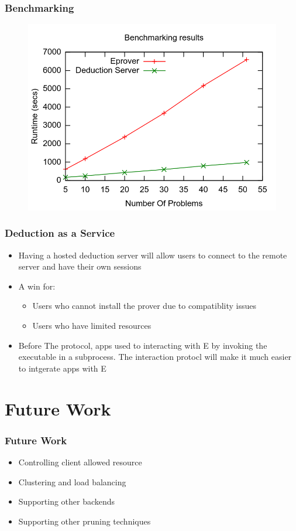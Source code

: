 \documentclass[10pt]{beamer}
\begin{document}
\begin{frame}[fragile]
  \frametitle{Benchmarking}
\begin{figure} \includegraphics[width=\linewidth,height=0.9\textheight,keepaspectratio]{imgs/BenchmarkingResults.png} \end{figure}
\end{frame}

\begin{frame}[fragile]
  \frametitle{Deduction as a Service}
  \begin{itemize}[<+- | alert@+>]
    \item Having a hosted deduction server will allow users to connect to the remote server and have their own sessions
    \item A win for:
      \begin{itemize}
          \item Users who cannot install the prover due to compatiblity issues
          \item Users who have limited resources
      \end{itemize}
    \item Before The protocol, apps used to interacting with E by invoking the executable in a subprocess. The interaction protocl will make it much easier to intgerate apps with E
  \end{itemize}

\end{frame}

\section{Future Work}
\begin{frame}[fragile]
  \frametitle{Future Work}
  \begin{itemize}[<+- | alert@+>]
    \item Controlling client allowed resource
    \item Clustering and load balancing
    \item Supporting other backends
    \item Supporting other pruning techniques
  \end{itemize}
\end{frame}
\end{document}

